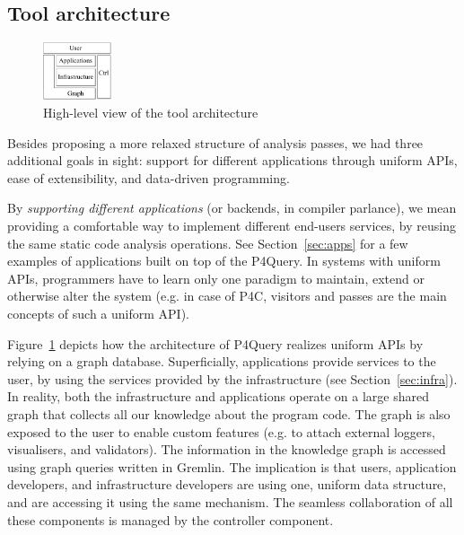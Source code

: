 \documentclass[sigconf]{acmart}
\begin{document}
\subsection{Tool architecture}\label{sec:rep} %


  \begin{figure}
    \includegraphics[width=0.18\textwidth]{figures/arch-top.pdf}
    \caption{High-level view of the tool architecture}\label{fig:arch-top}
  \end{figure}

Besides proposing a more relaxed structure of analysis passes, we had three additional goals in sight: support for different applications through uniform APIs, ease of extensibility, and data-driven programming.

By \textit{supporting different applications} (or backends, in compiler parlance), we mean providing a comfortable way to implement different end-users services, by reusing the same static code analysis operations.
See Section~\ref{sec:apps} for a few examples of applications built on top of the P4Query.
In systems with uniform APIs, programmers have to learn only one paradigm to maintain, extend or otherwise alter the system (e.g. in case of P4C, visitors and passes are the main concepts of such a uniform API). 

Figure~\ref{fig:arch-top} depicts how the architecture of P4Query realizes uniform APIs by relying on a graph database. 
Superficially, applications provide services to the user, by using the services provided by the infrastructure (see Section~\ref{sec:infra}). In reality, both the infrastructure and applications operate on a large shared graph that collects all our knowledge about the program code. The graph is also exposed to the user to enable custom features (e.g. to attach external loggers, visualisers, and validators). The information in the knowledge graph is accessed using graph queries written in Gremlin. The implication is that users, application developers, and infrastructure developers are using one, uniform data structure, and are accessing it using the same mechanism. The seamless collaboration of all these components is managed by the controller component.
\end{document}
